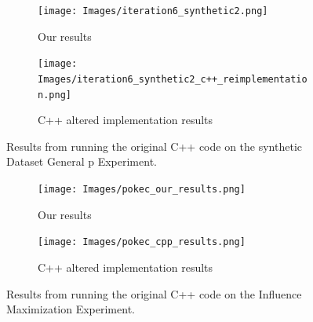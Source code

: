 \begin{figure}[h]
  \begin{minipage}{\linewidth}
      \centering
      \begin{minipage}{0.45\linewidth}
          \begin{figure}[H]
              \texttt{[image: Images/iteration6\_synthetic2.png]}
              \centering \par Our results
          \end{figure}
      \end{minipage}
      \begin{minipage}{0.45\linewidth}
          \begin{figure}[H]
              \texttt{[image: Images/iteration6\_synthetic2\_c++\_reimplementation.png]}
              \centering \par C++ altered implementation results
          \end{figure}
      \end{minipage}
  \end{minipage}
  \caption{Results from running the original C++ code on the synthetic Dataset General p Experiment.}
  \label{fig:secretary_experimentb_results}
\end{figure}


\begin{figure}[h!]
  \begin{minipage}{\linewidth}
      \centering
      \begin{minipage}{0.45\linewidth}
          \begin{figure}[H]
              \texttt{[image: Images/pokec\_our\_results.png]}
              \centering \par Our results
          \end{figure}
      \end{minipage}
      \begin{minipage}{0.45\linewidth}
          \begin{figure}[H]
              \texttt{[image: Images/pokec\_cpp\_results.png]}
              \centering \par C++ altered implementation results
          \end{figure}
      \end{minipage}
  \end{minipage}
  \caption{Results from running the original C++ code on the Influence Maximization Experiment.}
  \label{fig:secretary_experimentd_results}
\end{figure}


